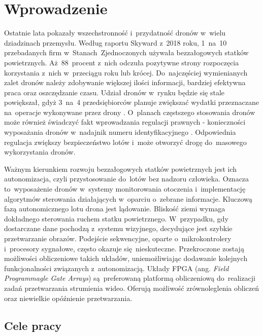 \chapter{Wprowadzenie}
\label{cha:wprowadzenie}

Ostatnie lata pokazały wszechstronność i~przydatność dronów w~wielu dziadzinach przemysłu. Według raportu Skyward z~2018 roku, 1~na~10 przebadanych firm w~Stanach~Zjednoczonych używała bezzałogowych statków powietrznych. Aż~88~procent z~nich odczuła pozytywne strony rozpoczęcia korzystania z~nich w~przeciągu roku lub krócej. Do~najczęściej wymienianych zalet dronów należy zdobywanie większej ilości informacji, bardziej efektywna praca oraz oszczędzanie czasu. Udział dronów w~rynku będzie się stale powiększał, gdyż 3~na~4 przedsiębiorców planuje zwiększać wydatki przeznaczane na~operacje wykonywane przez drony \cite{skyward}. O~planach częstszego stosowania dronów może również świadczyć fakt wprowadzania regulacji prawnych - konieczności wyposażania dronów w~nadajnik numeru identyfikacyjnego \cite{drone_article}. Odpowiednia regulacja zwiększy bezpieczeństwo lotów i~może otworzyć drogę do~masowego wykorzystania dronów.\par
Ważnym kierunkiem rozwoju bezzałogowych statków powietrznych jest ich autonomizacja, czyli przystosowanie do~lotów bez nadzoru człowieka. Oznacza to~wyposażenie dronów w~systemy monitorowania otoczenia i~implementację algorytmów sterowania działających w~oparciu o~zebrane informacje. Kluczową fazą autonomicznego lotu drona jest lądowanie. Bliskość ziemi wymaga dokładnego sterowania ruchem statku powietrznego. W~przypadku, gdy dostarczane dane pochodzą z~systemu wizyjnego, decydujące jest szybkie przetwarzanie obrazów. Podejście sekwencyjne, oparte o~mikrokontrolery i~procesory sygnałowe, często okazuje się~nieskuteczne. Przekroczone zostają możliwości obliczeniowe takich układów, uniemożliwiając dodawanie kolejnych funkcjonalności związanych z~autonomizacją. Układy FPGA (ang. \textit{Field Programmagle Gate Arrays}) są~preferowaną platformą obliczeniową do~realizacji zadań przetwarzania strumienia wideo. Oferują możliwość zrównoleglenia obliczeń oraz niewielkie opóźnienie przetwarzania. 

\section{Cele pracy}
\label{sec:celePracy}

